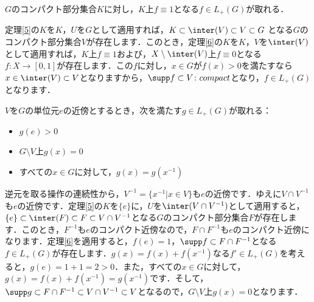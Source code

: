 \begin{lem}\label{14}
$G$のコンパクト部分集合$K$に対し，$K$上$f \equiv 1$となる$f \in L_{+}(G)$が取れる．
\end{lem}
\begin{Proof}
定理\ref{5}の$K$を$K$，$U$を$G$として適用すれば，$K \subset \inter(V) \subset V \subset G$ となる$G$のコンパクト部分集合$V$が存在します．このとき，定理\ref{6}の$K$を$K$，$V$を$\inter(V)$として適用すれば，$K$上$f \equiv 1$および，$X \setminus \inter(V)$上$f \equiv 0$となる$f \colon X \to [0, 1]$が存在します．この$f$に対し，$x \in G$が$f(x)>0$を満たすなら$x \in \inter(V) \subset V$となりますから，$\supp f \subset V \colon compact$となり，$f \in L_{+}(G)$となります．
\end{Proof}
\begin{lem}\label{15}
$V$を$G$の単位元$e$の近傍とするとき，次を満たす$g \in L_{+}(G)$が取れる：
\begin{itemize}
 \item $g(e)>0$
 \item $G \setminus V$上$g(x)=0$
 \item すべての$x \in G$に対して，$g(x)=g(x^{-1})$
\end{itemize}
\end{lem}
\begin{Proof}
逆元を取る操作の連続性から，$V^{-1}=\{ x^{-1} | x \in V \}$も$e$の近傍です．ゆえに$V \cap V^{-1}$も$e$の近傍です．定理\ref{5}の$K$を$\{e\}$に，$U$を$\inter(V \cap V^{-1})$として適用すると，$\{e\} \subset \inter(F) \subset F \subset V \cap V^{-1}$となる$G$のコンパクト部分集合$F$が存在します．このとき，$F^{-1}$も$e$のコンパクト近傍なので，$F \cap F^{-1}$も$e$のコンパクト近傍になります．定理\ref{6}を適用すると，$f(e)=1$，$\supp f \subset F \cap F^{-1}$となる$f \in L_{+}(G)$が存在します．$g(x)=f(x)+f(x^{-1})$なる$f' \in L_{+}(G)$を考えると，$g(e)=1+1=2>0$．また，すべての$x \in G$に対して，$g(x)=f(x)+f(x^{-1})=g(x^{-1})$です．そして，$\supp g \subset F \cap F^{-1} \subset V \cap V^{-1} \subset V$となるので，$G \setminus V$上$g(x)=0$となります．　
\end{Proof}

